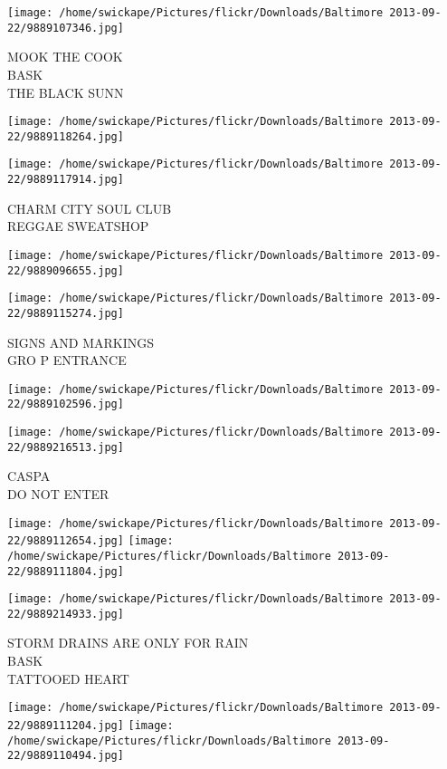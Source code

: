 \documentclass[10pt,letterpaper]{article}
\begin{document}
\texttt{[image: /home/swickape/Pictures/flickr/Downloads/Baltimore 2013-09-22/9889107346.jpg]}

MOOK THE COOK\\
BASK\\
THE BLACK SUNN
\pagebreak

\texttt{[image: /home/swickape/Pictures/flickr/Downloads/Baltimore 2013-09-22/9889118264.jpg]}

\vspace{0.25in}
\texttt{[image: /home/swickape/Pictures/flickr/Downloads/Baltimore 2013-09-22/9889117914.jpg]}

CHARM CITY SOUL CLUB\\
REGGAE SWEATSHOP
\pagebreak

\texttt{[image: /home/swickape/Pictures/flickr/Downloads/Baltimore 2013-09-22/9889096655.jpg]}

\vspace{0.25in}
\texttt{[image: /home/swickape/Pictures/flickr/Downloads/Baltimore 2013-09-22/9889115274.jpg]}

SIGNS AND MARKINGS\\
GRO P ENTRANCE
\pagebreak

\texttt{[image: /home/swickape/Pictures/flickr/Downloads/Baltimore 2013-09-22/9889102596.jpg]}

\vspace{0.25in}
\texttt{[image: /home/swickape/Pictures/flickr/Downloads/Baltimore 2013-09-22/9889216513.jpg]}

CASPA\\
DO NOT ENTER
\pagebreak

\texttt{[image: /home/swickape/Pictures/flickr/Downloads/Baltimore 2013-09-22/9889112654.jpg]}
\texttt{[image: /home/swickape/Pictures/flickr/Downloads/Baltimore 2013-09-22/9889111804.jpg]}

\vspace{0.25in}
\texttt{[image: /home/swickape/Pictures/flickr/Downloads/Baltimore 2013-09-22/9889214933.jpg]}

STORM DRAINS ARE ONLY FOR RAIN\\
BASK\\
TATTOOED HEART
\pagebreak

\texttt{[image: /home/swickape/Pictures/flickr/Downloads/Baltimore 2013-09-22/9889111204.jpg]}
\texttt{[image: /home/swickape/Pictures/flickr/Downloads/Baltimore 2013-09-22/9889110494.jpg]}
\end{document}
